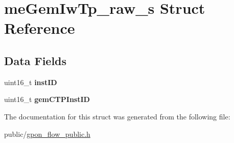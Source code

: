 \hypertarget{structmeGemIwTp__raw__s}{}\section{me\+Gem\+Iw\+Tp\+\_\+raw\+\_\+s Struct Reference}
\label{structmeGemIwTp__raw__s}
\subsection*{Data Fields}
\begin{DoxyCompactItemize}
\item 
\mbox{\label{structmeGemIwTp__raw__s_af2881bd35ae2af93aaa005d603e97495}} 
uint16\+\_\+t {\bfseries inst\+ID}
\item 
\mbox{\label{structmeGemIwTp__raw__s_a5e7f9dd4a73b425ea1ead28ec0a3c6ea}} 
uint16\+\_\+t {\bfseries gem\+C\+T\+P\+Inst\+ID}
\end{DoxyCompactItemize}


The documentation for this struct was generated from the following file\+:\begin{DoxyCompactItemize}
\item 
public/\hyperlink{gpon__flow__public_8h}{gpon\+\_\+flow\+\_\+public.\+h}\end{DoxyCompactItemize}
